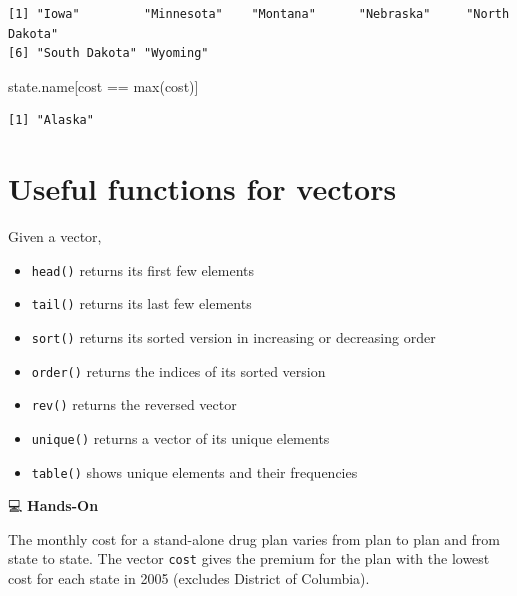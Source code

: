 \documentclass[
  letterpaper,
  DIV=11,
  numbers=noendperiod]{scrreprt}
\newenvironment{Shaded}{\begin{snugshade}}{\end{snugshade}}
\newcommand{\FunctionTok}[1]{\textcolor[rgb]{0.28,0.35,0.67}{#1}}
\newcommand{\NormalTok}[1]{\textcolor[rgb]{0.00,0.23,0.31}{#1}}
\newcommand{\SpecialCharTok}[1]{\textcolor[rgb]{0.37,0.37,0.37}{#1}}
\begin{document}
\begin{tcolorbox}
\begin{verbatim}
[1] "Iowa"         "Minnesota"    "Montana"      "Nebraska"     "North Dakota"
[6] "South Dakota" "Wyoming"     
\end{verbatim}

\begin{Shaded}
\begin{Highlighting}[]
\NormalTok{state.name[cost }\SpecialCharTok{==} \FunctionTok{max}\NormalTok{(cost)]}
\end{Highlighting}
\end{Shaded}

\begin{verbatim}
[1] "Alaska"
\end{verbatim}

\end{tcolorbox}

\section{Useful functions for
vectors}\label{useful-functions-for-vectors}

Given a vector,

\begin{itemize}
\item
  \texttt{head()} returns its first few elements
\item
  \texttt{tail()} returns its last few elements
\item
  \texttt{sort()} returns its sorted version in increasing or decreasing
  order
\item
  \texttt{order()} returns the indices of its sorted version
\item
  \texttt{rev()} returns the reversed vector
\item
  \texttt{unique()} returns a vector of its unique elements
\item
  \texttt{table()} shows unique elements and their frequencies
\end{itemize}

💻 \textbf{Hands-On}

The monthly cost for a stand-alone drug plan varies from plan to plan
and from state to state. The vector \texttt{cost} gives the premium for
the plan with the lowest cost for each state in 2005 (excludes District
of Columbia).
\end{document}

